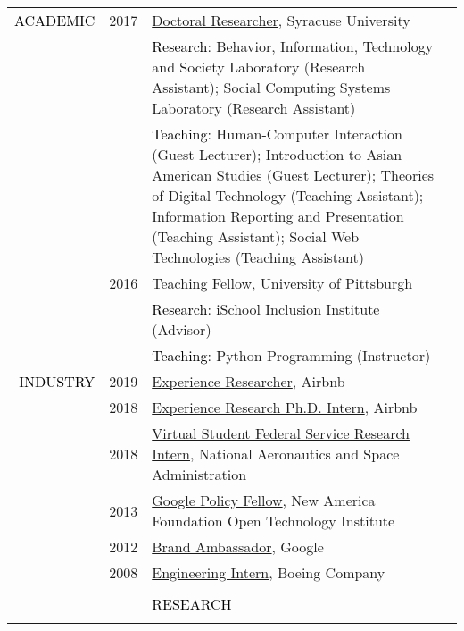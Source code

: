 \documentclass[12pt]{article}
\begin{document}
{{\begin{longtable}{Rp{1.0in}p{0.25in}p{4.75in}}
\textcolor{black}{\footnotesize{\uppercase{Academic}}} & \footnotesize{2017} & \href{http://bits.ischool.syr.edu/}{{Doctoral Researcher}}, Syracuse University \\ && \textcolor{black}{Research}: Behavior, Information, Technology and Society Laboratory (Research Assistant); Social Computing Systems Laboratory (Research Assistant) \\ && \textcolor{black}{Teaching}: Human-Computer Interaction (Guest Lecturer); Introduction to Asian American Studies (Guest Lecturer); Theories of Digital Technology (Teaching Assistant); Information Reporting and Presentation (Teaching Assistant); Social Web Technologies (Teaching Assistant) \\

& \footnotesize{2016} & \href{http://www.sis.pitt.edu/i3/phd-fellows/fellow-profiles.html}{{Teaching Fellow}}, University of Pittsburgh \\ &&\textcolor{black}{Research}: iSchool Inclusion Institute (Advisor) \\ &&\textcolor{black}{Teaching}: Python Programming (Instructor) \\

\textcolor{black}{\footnotesize{\uppercase{Industry}}} & \footnotesize{2019} & \href{https://www.airbnb.com/}{{Experience Researcher}}, Airbnb \\

& \footnotesize{2018} & \href{https://www.airbnb.com/}{{Experience Research Ph.D. Intern}}, Airbnb \\

& \footnotesize{2018} & \href{https://vsfs.state.gov/about}{{Virtual Student Federal Service Research Intern}}, National Aeronautics and Space Administration \\

& \footnotesize{2013} & \href{https://www.google.com/policyfellowship/2013fellows.html}{{Google Policy Fellow}}, New America Foundation Open Technology Institute \\

& \footnotesize{2012} & \href{https://students.googleblog.com/2012/09/a-new-class-of-google-student.html}{{Brand Ambassador}}, Google \\

& \footnotesize{2008} & \href{https://www.engr.washington.edu/current/studentprogs/alva}{{Engineering Intern}}, Boeing Company
\\
\\
&&\par \Large \textcolor{black}{\uppercase{Research}} \\ \hhline{~~-}


\end{longtable}}}
\end{document}

